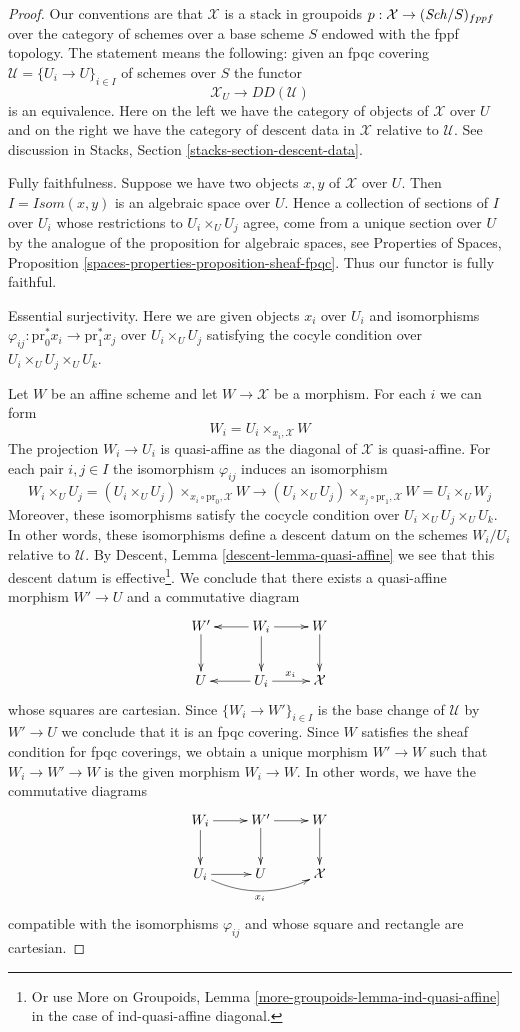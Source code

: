 \begin{proof}
Our conventions are that $\mathcal{X}$ is a stack
in groupoids $p : \mathcal{X} \to (\mathit{Sch}/S)_{fppf}$
over the category of schemes over a base scheme $S$ endowed
with the fppf topology. The statement means the following:
given an fpqc covering $\mathcal{U} = \{U_i \to U\}_{i \in I}$
of schemes over $S$ the functor
$$
\mathcal{X}_U \longrightarrow DD(\mathcal{U})
$$
is an equivalence. Here on the left we have the category
of objects of $\mathcal{X}$ over $U$ and on the right we have
the category of descent data in $\mathcal{X}$ relative to $\mathcal{U}$.
See discussion in Stacks, Section \ref{stacks-section-descent-data}.

\medskip\noindent
Fully faithfulness. Suppose we have two objects $x, y$ of $\mathcal{X}$
over $U$. Then $I = \mathit{Isom}(x, y)$ is an algebraic space over $U$.
Hence a collection of sections of $I$ over $U_i$ whose restrictions
to $U_i \times_U U_j$ agree, come from a unique section over $U$ by
the analogue of the proposition for algebraic spaces, see
Properties of Spaces, Proposition
\ref{spaces-properties-proposition-sheaf-fpqc}.
Thus our functor is fully faithful.

\medskip\noindent
Essential surjectivity. Here we are given objects
$x_i$ over $U_i$ and isomorphisms
$\varphi_{ij} : \text{pr}_0^*x_i \to \text{pr}_1^*x_j$
over $U_i \times_U U_j$ satisfying the cocyle condition
over $U_i \times_U U_j \times_U U_k$.

\medskip\noindent
Let $W$ be an affine scheme and let $W \to \mathcal{X}$
be a morphism. For each $i$ we can form
$$
W_i = U_i \times_{x_i, \mathcal{X}} W
$$
The projection $W_i \to U_i$ is quasi-affine as the
diagonal of $\mathcal{X}$ is quasi-affine. For each pair
$i, j \in I$ the isomorphism $\varphi_{ij}$ induces
an isomorphism
$$
W_i \times_U U_j =
(U_i \times_U U_j) \times_{x_i \circ \text{pr}_0, \mathcal{X}} W
\to
(U_i \times_U U_j) \times_{x_j \circ \text{pr}_1, \mathcal{X}} W =
U_i \times_U W_j
$$
Moreover, these isomorphisms satisfy the cocycle condition over
$U_i \times_U U_j \times_U U_k$. In other words, these isomorphisms
define a descent datum on the schemes $W_i/U_i$ relative to $\mathcal{U}$.
By Descent, Lemma \ref{descent-lemma-quasi-affine}
we see that this descent datum is effective\footnote{Or use
More on Groupoids, Lemma \ref{more-groupoids-lemma-ind-quasi-affine}
in the case of ind-quasi-affine diagonal.}.
We conclude that there exists a quasi-affine morphism
$W' \to U$ and a commutative diagram
$$
\xymatrix{
W' \ar[d] &
W_i \ar[l] \ar[d] \ar[r] &
W \ar[d] \\
U &
U_i \ar[l] \ar[r]^{x_i} &
\mathcal{X}
}
$$
whose squares are cartesian. Since $\{W_i \to W'\}_{i \in I}$
is the base change of $\mathcal{U}$ by $W' \to U$ we conclude
that it is an fpqc covering. Since $W$ satisfies the sheaf
condition for fpqc coverings, we obtain a unique morphism
$W' \to W$ such that $W_i \to W' \to W$ is the given morphism
$W_i \to W$. In other words, we have the commutative diagrams
$$
\xymatrix{
W_i \ar[d] \ar[r] &
W' \ar[d] \ar[r] &
W \ar[d] \\
U_i \ar[r] \ar@/_1pc/[rr]_{x_i} &
U &
\mathcal{X}
}
$$
compatible with the isomorphisms $\varphi_{ij}$ and whose
square and rectangle are cartesian.


\end{proof}
